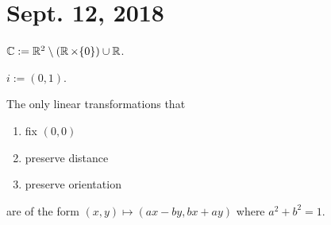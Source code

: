 \documentclass[notes]{subfiles}
\begin{document}
\section{Sept. 12, 2018}

\begin{definition}
$\operatorname{\mathbb{C}} := \mathbb{R}^2 \setminus (\operatorname{\mathbb{R}} \times \{0\}) \cup \operatorname{\mathbb{R}}$.
\end{definition}

\begin{definition}
    $i := (0,1)$.
\end{definition}

\begin{theorem}
    The only linear transformations that
    \begin{enumerate}
        \item fix $(0,0)$
        \item preserve distance
        \item preserve orientation
    \end{enumerate}
    are of the form $(x,y) \mapsto (ax - by, bx + ay)$ where $a^2 + b^2 = 1$.
\end{theorem}
\end{document}
